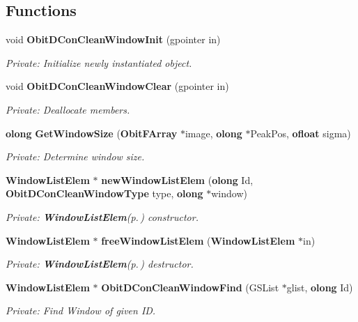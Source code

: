 \subsection*{Functions}
\begin{CompactItemize}
\item 
void {\bf Obit\-DCon\-Clean\-Window\-Init} (gpointer in)
\begin{CompactList}\small\item\em Private: Initialize newly instantiated object. \item\end{CompactList}\item 
void {\bf Obit\-DCon\-Clean\-Window\-Clear} (gpointer in)
\begin{CompactList}\small\item\em Private: Deallocate members. \item\end{CompactList}\item 
{\bf olong} {\bf Get\-Window\-Size} ({\bf Obit\-FArray} $\ast$image, {\bf olong} $\ast$Peak\-Pos, {\bf ofloat} sigma)
\begin{CompactList}\small\item\em Private: Determine window size. \item\end{CompactList}\item 
{\bf Window\-List\-Elem} $\ast$ {\bf new\-Window\-List\-Elem} ({\bf olong} Id, {\bf Obit\-DCon\-Clean\-Window\-Type} type, {\bf olong} $\ast$window)
\begin{CompactList}\small\item\em Private: {\bf Window\-List\-Elem}{\rm (p.\,\pageref{structWindowListElem})} constructor. \item\end{CompactList}\item 
{\bf Window\-List\-Elem} $\ast$ {\bf free\-Window\-List\-Elem} ({\bf Window\-List\-Elem} $\ast$in)
\begin{CompactList}\small\item\em Private: {\bf Window\-List\-Elem}{\rm (p.\,\pageref{structWindowListElem})} destructor. \item\end{CompactList}\item 
{\bf Window\-List\-Elem} $\ast$ {\bf Obit\-DCon\-Clean\-Window\-Find} (GSList $\ast$glist, {\bf olong} Id)
\begin{CompactList}\small\item\em Private: Find Window of given ID. \item\end{CompactList}\item 

\end{CompactItemize}
